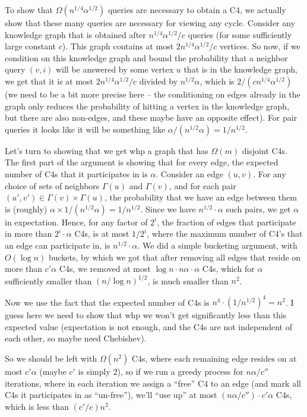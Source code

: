\documentclass{article}
\begin{document}
To show that $\Omega(n^{1/4} \alpha^{1/2})$ queries are necessary to obtain a C4, we actually show that these many queries are necessary for viewing any cycle. Consider any knowledge graph that is obtained after $n^{1/4} \alpha^{1/2}/c$ queries (for some sufficiently large constant $c$). This graph contains at most $2 n^{1/4} \alpha^{1/2}/c$ vertices. So now, if we condition on this knowledge graph and bound the probability that a neighbor query $(v,i)$ will be answered by some vertex $u$ that is in the knowledge graph, we get that it is at most $2 n^{1/4} \alpha^{1/2}/c$ divided by $n^{1/2}\alpha$, which is $2/(cn^{1/4}\alpha^{1/2})$ (we need to be a bit more precise here -- the conditioning on edges already in the graph only reduces the probability of hitting a vertex in the knowledge graph, but there are also non-edges, and these maybe have an opposite effect). For pair queries it looks like it will be something like $\alpha /(n^{1/2}\alpha) = 1/n^{1/2}$.

Let's turn to showing that we get whp a graph that has $\Omega(m)$ disjoint C4s. The first part of the argument is showing that for every edge, the expected number of C4s that it participates in is $\alpha$.
Consider an edge $(u,v)$. For any choice of sets of neighbors $\Gamma(u)$ and $\Gamma(v)$, and for each pair $(u',v') \in \Gamma(v) \times \Gamma(u)$, the probability that we have an edge between them is (roughly) $\alpha \times 1/(n^{1/2}\alpha) = 1/n^{1/2}$. Since we have $n^{1/2} \cdot \alpha$ such pairs, we get  $\alpha$ in expectation. Hence, for any factor of $2^i$, the fraction of edges that participate in more than $2^i\cdot \alpha$ C4s, is at most $1/2^i$, where the maximum number of C4's that an edge can participate in, is $n^{1/2}\cdot \alpha$. We did a simple bucketing argument, with $O(\log n)$ buckets, by which we got that after removing all edges that reside on more than $c' \alpha$ C4s, we removed at most $\log n \cdot n\alpha \cdot \alpha$ C4s, which for $\alpha$ sufficiently smaller than $(n/\log n)^{1/2}$, is much smaller than $n^2$.

Now we use the fact that the expected number of C4s is $n^4 \cdot (1/n^{1/2})^4 = n^2$. I guess here we need to show that whp we won't get significantly less than this expected value (expectation is not enough, and the C4s are not independent of each other, so maybe need Chebishev).

So we should be left with $\Omega(n^2)$ C4s, where each remaining edge resides on at most $c'\alpha$ (maybe $c'$ is simply $ 2$), so if we run a greedy process for $n\alpha/c''$ iterations, where in each iteration we  assign a ``free'' C4 to an edge (and mark all C4s it participates in as ``un-free''), we'll ``use up'' at most $(n \alpha/c'') \cdot c'\alpha$ C4s, which is less than $(c'/c) n^2$.
\end{document}
